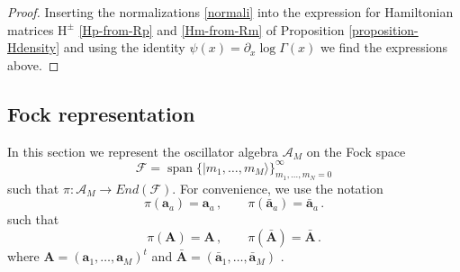 \documentclass[11pt]{article}
\numberwithin{equation}{section}
\newcommand{\oa}{\mathbf{a}}
\newcommand{\oad}{\mathbf{\bar{a}}}
\newcommand{\of}{\mathbf{a}}
\newcommand{\ofd}{\mathbf{\bar{a}}}
\newcommand{\OA}{\mathbf{A}}
\newcommand{\OAD}{\mathbf{\bar{A}}}
\newcommand{\OF}{\mathbf{A}}
\newcommand{\OFD}{\mathbf{\bar{A}}}
\newcommand{\abrOSCH}{\mathrm{H}}
\DeclareMathOperator{\spa}{span}
\begin{document}
\begin{proof}
Inserting the normalizations \eqref{normali} into the expression for Hamiltonian matrices $\abrOSCH^{\pm}$ \eqref{Hp-from-Rp} and \eqref{Hm-from-Rm} of Proposition \ref{proposition-Hdensity} and using the identity $\psi(x)=\partial_x\log \Gamma(x)$ we find the expressions above. 
		\end{proof}
		

\subsection{Fock representation}\label{sec:stoch}
In this section we represent the oscillator algebra $\mathcal{A}_M$ on the Fock space
\begin{equation}\label{fock-space}
 \mathcal{F}=\spa \{|m_1,\ldots,m_M\rangle\}_{m_1,\ldots,m_N=0}^\infty
\end{equation}
such that $\pi:\mathcal{A}_M\to End(\mathcal{F})$. 
For convenience, we use the notation
    \begin{equation}
\pi(\oa_{a})={\of_{a}}\,,\qquad \pi(\oad_{a})=\ofd_{a}\,.
	\end{equation}
	such that
	\begin{equation}\label{osc-notation-descrete}
\pi(\OA)=\OF\,,\qquad \pi(\OAD)=\OFD\,.
	\end{equation}
	where  $\OF=(\of_1,\ldots,\of_M)^{t}$ and   $\OFD=(\ofd_1,\ldots,\ofd_M)$ .
\end{document}
